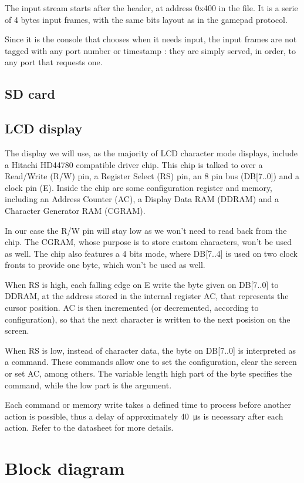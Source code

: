 \documentclass[a4paper,oneside,12pt]{article}
\begin{document}
The input stream starts after the header, at address 0x400 in the file. It is a
serie of 4 bytes input frames, with the same bits layout as in the gamepad
protocol.

Since it is the console that chooses when it needs input, the input frames are
not tagged with any port number or timestamp : they are simply served, in order,
to any port that requests one.

\subsection{SD card}

\subsection{LCD display}
The display we will use, as the majority of LCD character mode displays, include
a Hitachi HD44780 compatible driver chip. This chip is talked to over a
Read/Write (R/W) pin, a Register Select (RS) pin, an 8 pin bus (DB[7..0]) and a
clock pin (E). Inside the chip are some configuration register and memory,
including an Address Counter (AC), a Display Data RAM (DDRAM) and a Character
Generator RAM (CGRAM).

In our case the R/W pin will stay low as we won't need to read back from the
chip. The CGRAM, whose purpose is to store custom characters, won't be used as
well. The chip also features a 4 bits mode, where DB[7..4] is used on two clock
fronts to provide one byte, which won't be used as well.

When RS is high, each falling edge on E write the byte given on DB[7..0] to
DDRAM, at the address stored in the internal register AC, that represents the
cursor position. AC is then incremented (or decremented, according to
configuration), so that the next character is written to the next posision on
the screen.

When RS is low, instead of character data, the byte on DB[7..0] is interpreted
as a command. These commands allow one to set the configuration, clear the
screen or set AC, among others. The variable length high part of the byte
specifies the command, while the low part is the argument.

Each command or memory write takes a defined time to process before another
action is possible, thus a delay of approximately \SI{40}{\us} is necessary
after each action. Refer to the datasheet for more details.

\section{Block diagram}
\end{document}
